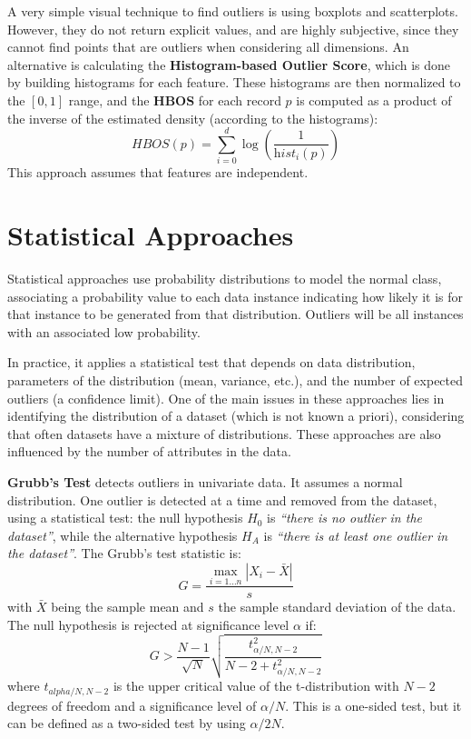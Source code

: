 A very simple visual technique to find outliers is using boxplots and scatterplots. However, they do not return explicit values, and are highly subjective, since they cannot find points that are outliers when considering all dimensions. An alternative is calculating the \textbf{Histogram-based Outlier Score}, which is done by building histograms for each feature. These histograms are then normalized to the $[0,1]$ range, and the \textbf{HBOS} for each record $p$ is computed as a product of the inverse of the estimated density (according to the histograms):
\begin{equation*}
    \textit{HBOS}(p) = \sum_{i=0}^d \log(\dfrac{1}{\textit{hist}_i(p)})
\end{equation*}
This approach assumes that features are independent.

\section{Statistical Approaches}

Statistical approaches use probability distributions to model the normal class, associating a probability value to each data instance indicating how likely it is for that instance to be generated from that distribution. Outliers will be all instances with an associated low probability.

In practice, it applies a statistical test that depends on data distribution, parameters of the distribution (mean, variance, etc.), and the number of expected outliers (a confidence limit). One of the main issues in these approaches lies in identifying the distribution of a dataset (which is not known a priori), considering that often datasets have a mixture of distributions. These approaches are also influenced by the number of attributes in the data.

\textbf{Grubb's Test} detects outliers in univariate data. It assumes a normal distribution. One outlier is detected at a time and removed from the dataset, using a statistical test: the null hypothesis $H_0$ is \textit{``there is no outlier in the dataset''}, while the alternative hypothesis $H_A$ is \textit{``there is at least one outlier in the dataset''}. The Grubb's test statistic is:
\begin{equation*}
    G = \dfrac{\max_{i=1\dots n} |X_i - \bar{X}|}{s} 
\end{equation*}
with $\bar{X}$ being the sample mean and $s$ the sample standard deviation of the data.
The null hypothesis is rejected at significance level $\alpha$ if:
\begin{equation*}
    G > \dfrac{N-1}{\sqrt{N}} \sqrt{\dfrac{t^2_{\alpha/N, N-2}}{N-2+t^2_{\alpha/N, N-2}}}
\end{equation*}
where $t_{alpha/N, N-2}$ is the upper critical value of the t-distribution with $N-2$ degrees of freedom and a significance level of $\alpha/N$. This is a one-sided test, but it can be defined as a two-sided test by using $\alpha/2N$.

